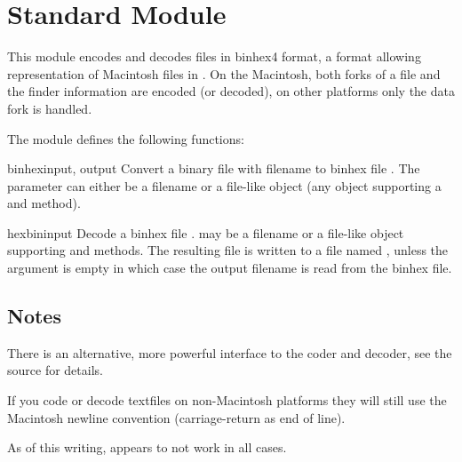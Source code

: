 \section{Standard Module }
\label{module-binhex}

This module encodes and decodes files in binhex4 format, a format
allowing representation of Macintosh files in \ASCII{}. On the Macintosh,
both forks of a file and the finder information are encoded (or
decoded), on other platforms only the data fork is handled.

The  module defines the following functions:

\begin{funcdesc}{binhex}{input, output}
Convert a binary file with filename  to binhex file
. The  parameter can either be a filename or a
file-like object (any object supporting a  and 
method).
\end{funcdesc}

\begin{funcdesc}{hexbin}{input}
Decode a binhex file .  may be a filename or a
file-like object supporting  and  methods.
The resulting file is written to a file named , unless the
argument is empty in which case the output filename is read from the
binhex file.
\end{funcdesc}

\subsection{Notes}
There is an alternative, more powerful interface to the coder and
decoder, see the source for details.

If you code or decode textfiles on non-Macintosh platforms they will
still use the Macintosh newline convention (carriage-return as end of
line).

As of this writing,  appears to not work in all
cases.
